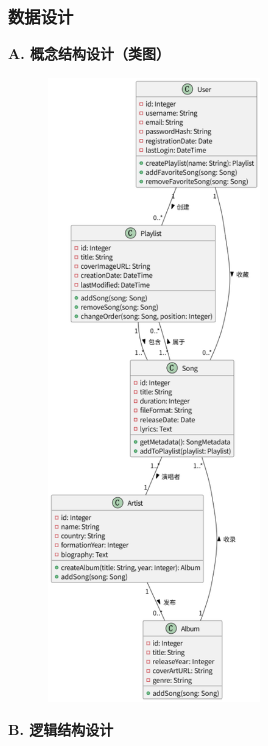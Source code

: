\documentclass{base}
\numberwithin{figure}{section} %
\begin{document}
\subsubsection{数据设计}

\textbf{A. 概念结构设计（类图）}

\begin{figure}[H]
    \centering
    \includegraphics[width=0.5\textwidth]{images/5-14.png}
\end{figure}

\textbf{B. 逻辑结构设计}
\end{document}
